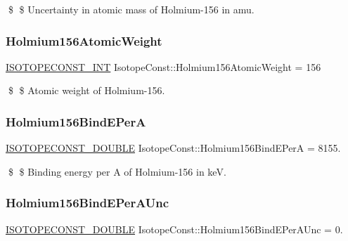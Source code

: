 \$ \$ Uncertainty in atomic mass of Holmium-\/156 in amu. \mbox{\label{group___isotope_const-_holmium-_ho156_ga0fe7994f01891af7884d303ec686da6c}} 
\subsubsection{\texorpdfstring{Holmium156\+Atomic\+Weight}{Holmium156AtomicWeight}}
{\footnotesize\ttfamily \mbox{\hyperlink{group___isotope_const-_macros_ga5f18360b3e99483a35c32d789e62621c}{I\+S\+O\+T\+O\+P\+E\+C\+O\+N\+S\+T\+\_\+\+I\+NT}} Isotope\+Const\+::\+Holmium156\+Atomic\+Weight = 156}

\$ \$ Atomic weight of Holmium-\/156. \mbox{\label{group___isotope_const-_holmium-_ho156_ga2430299c5329954a0601647bbe2d06b2}} 
\subsubsection{\texorpdfstring{Holmium156\+Bind\+E\+PerA}{Holmium156BindEPerA}}
{\footnotesize\ttfamily \mbox{\hyperlink{group___isotope_const-_macros_ga8f45a7272ce02c0b4c65c44636ed719a}{I\+S\+O\+T\+O\+P\+E\+C\+O\+N\+S\+T\+\_\+\+D\+O\+U\+B\+LE}} Isotope\+Const\+::\+Holmium156\+Bind\+E\+PerA = 8155.}

\$ \$ Binding energy per A of Holmium-\/156 in keV. \mbox{\label{group___isotope_const-_holmium-_ho156_ga30619848d65b0c6e4573cf18d7265ce6}} 
\subsubsection{\texorpdfstring{Holmium156\+Bind\+E\+Per\+A\+Unc}{Holmium156BindEPerAUnc}}
{\footnotesize\ttfamily \mbox{\hyperlink{group___isotope_const-_macros_ga8f45a7272ce02c0b4c65c44636ed719a}{I\+S\+O\+T\+O\+P\+E\+C\+O\+N\+S\+T\+\_\+\+D\+O\+U\+B\+LE}} Isotope\+Const\+::\+Holmium156\+Bind\+E\+Per\+A\+Unc = 0.}

